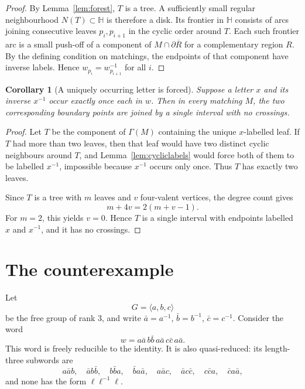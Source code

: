 \documentclass[11pt]{article}
\newtheorem{corollary}{Corollary}
\newcommand{\HH}{\mathbb H}
\newcommand{\bd}{\partial}
\begin{document}
\begin{proof}
By Lemma~\ref{lem:forest}, \(T\) is a tree.  A sufficiently small regular neighbourhood \(N(T)\subset \HH\) is therefore a disk.  Its frontier in \(\HH\) consists of arcs joining consecutive leaves \(p_i,p_{i+1}\) in the cyclic order around \(T\).  Each such frontier arc is a small push-off of a component of \(M\cap \bd\overline R\) for a complementary region \(R\).  By the defining condition on matchings, the endpoints of that component have inverse labels.  Hence \(w_{p_i}=w_{p_{i+1}}^{-1}\) for all \(i\).
\end{proof}

\begin{corollary}[A uniquely occurring letter is forced]\label{cor:forced}
Suppose a letter \(x\) and its inverse \(x^{-1}\) occur exactly once each in \(w\).  Then in every matching \(M\), the two corresponding boundary points are joined by a single interval with no crossings.
\end{corollary}

\begin{proof}
Let \(T\) be the component of \(\Gamma(M)\) containing the unique \(x\)-labelled leaf.  If \(T\) had more than two leaves, then that leaf would have two distinct cyclic neighbours around \(T\), and Lemma~\ref{lem:cycliclabels} would force both of them to be labelled \(x^{-1}\), impossible because \(x^{-1}\) occurs only once.  Thus \(T\) has exactly two leaves.

Since \(T\) is a tree with \(m\) leaves and \(v\) four-valent vertices, the degree count gives
\[
m+4v=2(m+v-1).
\]
For \(m=2\), this yields \(v=0\).  Hence \(T\) is a single interval with endpoints labelled \(x\) and \(x^{-1}\), and it has no crossings.
\end{proof}

\section{The counterexample}

Let
\[
G=\langle a,b,c\rangle
\]
be the free group of rank \(3\), and write \(\bar a=a^{-1}\), \(\bar b=b^{-1}\), \(\bar c=c^{-1}\).  Consider the word
\[
w=a\bar a\, b\bar b\, a\bar a\, c\bar c\, a\bar a.
\]
This word is freely reducible to the identity.  It is also quasi-reduced: its length-three subwords are
\[
a\bar a b,\quad
\bar a b\bar b,\quad
b\bar b a,\quad
\bar b a\bar a,\quad
a\bar a c,\quad
\bar a c\bar c,\quad
c\bar c a,\quad
\bar c a\bar a,
\]
and none has the form \(\ell\ell^{-1}\ell\).
\end{document}

